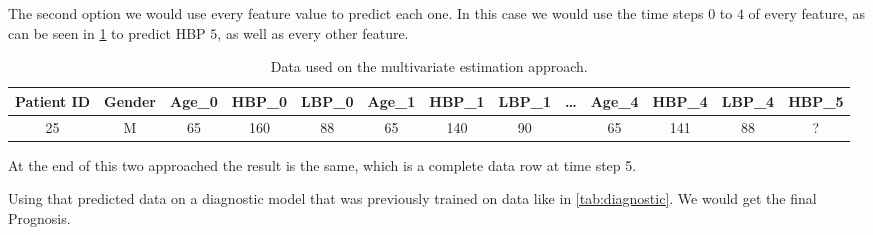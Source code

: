 The second option we would use every feature value to predict each one. In this case we would use the time steps $0$ to $4$ of every feature, as can be seen in \ref{tab:approach2} to predict
HBP $5$, as well as every other feature.

\begin{table}[h]
	
	\begin{center}
		\begin{tabular}{ccccccccccccc}
			\textbf{Patient ID} & \textbf{Gender} & \textbf{Age\_0} & \textbf{HBP\_0} & \textbf{LBP\_0} & \textbf{Age\_1} & \textbf{HBP\_1} & \textbf{LBP\_1} & \textbf{…} & \textbf{Age\_4} & \textbf{HBP\_4} & \textbf{LBP\_4} & \textbf{HBP\_5} \\ \hline
			25                  & M               & 65              & 160             & 88              & 65              & 140             & 90              &            & 65              & 141             & 88              & ?              \\ \hline
		\end{tabular}
		\caption{Data used on the multivariate estimation approach.}
		\label{tab:approach2}
	\end{center}
\end{table}

At the end of this two approached the result is the same, which is a complete data row at time step 5.

Using that predicted data on a diagnostic model that was previously trained on data like in \ref{tab:diagnostic}.
We would get the final Prognosis.

\cleardoublepage